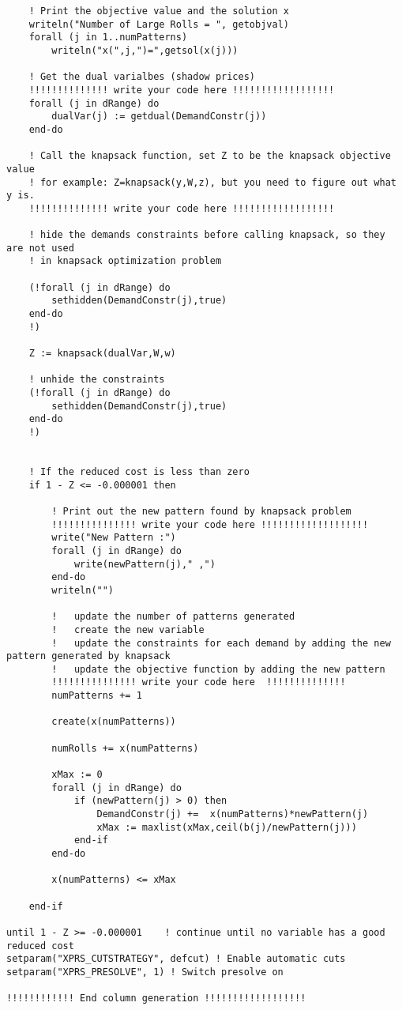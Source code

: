 \documentclass[twoside,12pt]{article}
\begin{document}
\begin{verbatim}
	! Print the objective value and the solution x
	writeln("Number of Large Rolls = ", getobjval)
	forall (j in 1..numPatterns)
		writeln("x(",j,")=",getsol(x(j)))
				
	! Get the dual varialbes (shadow prices) 
	!!!!!!!!!!!!!! write your code here !!!!!!!!!!!!!!!!!!
	forall (j in dRange) do
		dualVar(j) := getdual(DemandConstr(j))
	end-do

	! Call the knapsack function, set Z to be the knapsack objective value
	! for example: Z=knapsack(y,W,z), but you need to figure out what y is.
	!!!!!!!!!!!!!! write your code here !!!!!!!!!!!!!!!!!!
		
	! hide the demands constraints before calling knapsack, so they are not used 
	! in knapsack optimization problem
	
	(!forall (j in dRange) do
		sethidden(DemandConstr(j),true)
	end-do
	!)
	
	Z := knapsack(dualVar,W,w)	

	! unhide the constraints
	(!forall (j in dRange) do
		sethidden(DemandConstr(j),true)
	end-do
	!)
	

	! If the reduced cost is less than zero
	if 1 - Z <= -0.000001 then
		
		! Print out the new pattern found by knapsack problem
		!!!!!!!!!!!!!!! write your code here !!!!!!!!!!!!!!!!!!!
		write("New Pattern :")
		forall (j in dRange) do
			write(newPattern(j)," ,")
		end-do
		writeln("")		
		
		!	update the number of patterns generated
		! 	create the new variable
		!	update the constraints for each demand by adding the new pattern generated by knapsack
		!	update the objective function by adding the new pattern
		!!!!!!!!!!!!!!! write your code here  !!!!!!!!!!!!!!
		numPatterns += 1
		
		create(x(numPatterns))
		
		numRolls += x(numPatterns)
		
		xMax := 0
		forall (j in dRange) do
			if (newPattern(j) > 0) then
				DemandConstr(j) +=  x(numPatterns)*newPattern(j)
				xMax := maxlist(xMax,ceil(b(j)/newPattern(j)))
			end-if
		end-do
			
		x(numPatterns) <= xMax
		
	end-if
	
until 1 - Z >= -0.000001	! continue until no variable has a good reduced cost
setparam("XPRS_CUTSTRATEGY", defcut) ! Enable automatic cuts 
setparam("XPRS_PRESOLVE", 1) ! Switch presolve on

!!!!!!!!!!!! End column generation !!!!!!!!!!!!!!!!!!


\end{verbatim}
\end{document}

